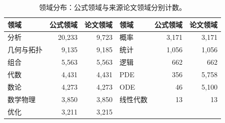 \begin{table}[htbp]\centering\small\caption{领域分布：公式领域与来源论文领域分别计数。}\label{tab:domains}\begin{tabular}{lrr@{\qquad}lrr}\toprule 领域&公式领域&论文领域&领域&公式领域&论文领域\\\midrule
分析 & 20,233 & 9,723 & 概率 & 3,171 & 3,171 \\
几何与拓扑 & 9,135 & 9,185 & 统计 & 1,056 & 1,056 \\
组合 & 5,563 & 5,563 & 逻辑 & 662 & 662 \\
代数 & 4,431 & 4,431 & PDE & 356 & 5,758 \\
数论 & 4,273 & 4,273 & ODE & 46 & 5,100 \\
数学物理 & 3,850 & 3,850 & 线性代数 & 13 & 13 \\
优化 & 3,211 & 3,215 &  &  &  \\
\bottomrule\end{tabular}\end{table}
